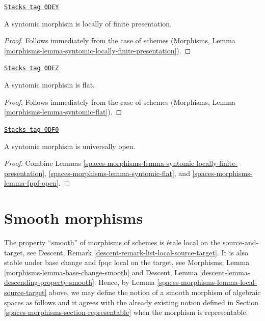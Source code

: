 \begin{lemma}
\label{spaces-morphisms-lemma-syntomic-locally-finite-presentation}
\href{https://stacks.math.columbia.edu/tag/0DEY}{\texttt{Stacks tag 0DEY}}

A syntomic morphism is locally of finite presentation.
\end{lemma}

\begin{proof}
Follows immediately from the case of schemes
(Morphisms, Lemma \ref{morphisms-lemma-syntomic-locally-finite-presentation}).
\end{proof}

\begin{lemma}
\label{spaces-morphisms-lemma-syntomic-flat}
\href{https://stacks.math.columbia.edu/tag/0DEZ}{\texttt{Stacks tag 0DEZ}}

A syntomic morphism is flat.
\end{lemma}

\begin{proof}
Follows immediately from the case of schemes
(Morphisms, Lemma \ref{morphisms-lemma-syntomic-flat}).
\end{proof}

\begin{lemma}
\label{spaces-morphisms-lemma-syntomic-open}
\href{https://stacks.math.columbia.edu/tag/0DF0}{\texttt{Stacks tag 0DF0}}

A syntomic morphism is universally open.
\end{lemma}

\begin{proof}
Combine
Lemmas \ref{spaces-morphisms-lemma-syntomic-locally-finite-presentation},
\ref{spaces-morphisms-lemma-syntomic-flat}, and
\ref{spaces-morphisms-lemma-fppf-open}.
\end{proof}

\section{Smooth morphisms}
\label{spaces-morphisms-section-smooth}
The property ``smooth'' of morphisms of schemes is
\'etale local on the source-and-target, see
Descent, Remark \ref{descent-remark-list-local-source-target}.
It is also stable under base change and fpqc local on the target, see
Morphisms, Lemma \ref{morphisms-lemma-base-change-smooth}
and
Descent, Lemma \ref{descent-lemma-descending-property-smooth}.
Hence, by
Lemma \ref{spaces-morphisms-lemma-local-source-target}
above, we may define the notion of a smooth morphism of algebraic spaces as
follows and it agrees with the already existing notion defined in
Section \ref{spaces-morphisms-section-representable}
when the morphism is representable.

